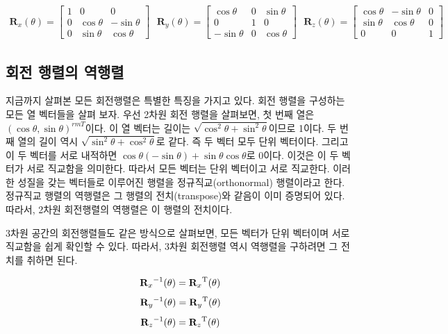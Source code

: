 {\small
\begin{eqnarray}
\mathbf R_x(\theta)
=
\left [ \begin{array}{rrr}
1 & 0 & 0 \\
0 & \cos \theta & - \sin \theta \\
0 & \sin \theta & \cos \theta
\end{array} \right ]
~~~
\mathbf R_y(\theta)
=
\left [ \begin{array}{rrr}
\cos \theta & 0 &  \sin \theta  \\
0 & 1 & 0 \\
- \sin \theta & 0 & \cos \theta
\end{array} \right ]
~~~
\mathbf R_z(\theta)
=
\left [ \begin{array}{rrr}
\cos \theta &- \sin \theta  & 0  \\
\sin \theta & \cos \theta  & 0 \\
0 & 0  & 1 
\end{array} \right ]
\end{eqnarray}
}

\subsection{회전 행렬의 역행렬}

지금까지 살펴본 모든 회전행렬은 특별한 특징을 가지고 있다.
회전 행렬을 구성하는 모든 열 벡터들을 살펴 보자.
우선 2차원 회전 행렬을 살펴보면, 첫 번째 열은 $(\cos \theta , \sin \theta)^{rm T}$이다.
이 열 벡터는 길이는 $\sqrt{ \cos^2 \theta + \sin^2 \theta}$이므로 1이다. 
두 번째 열의 길이 역시 $\sqrt{ \sin^2 \theta + \cos^2 \theta}$로 같다. 
즉 두 벡터 모두 단위 벡터이다. 그리고 이 두 벡터를 서로 내적하면
$\cos \theta ( - \sin \theta) + \sin \theta  \cos \theta $로 0이다. 이것은 이 두 벡터가 서로 직교함을 의미한다.
따라서 모든 벡터는 단위 벡터이고 서로 직교한다. 이러한 성질을 갖는 벡터들로 이루어진 행렬을 정규직교(orthonormal) 행렬이라고 한다.
정규직교 행렬의 역행렬은 그 행렬의 전치(transpose)와 같음이 이미 증명되어 있다.
따라서, 2차원 회전행렬의 역행렬은 이 행렬의 전치이다.

3차원 공간의 회전행렬들도 같은 방식으로 살펴보면, 모든 벡터가 단위 벡터이며 서로 직교함을 쉽게 확인할 수 있다.
따라서, 3차원 회전행렬 역시 역행렬을 구하려면 그 전치를 취하면 된다.

$${{\mathbf R}_x}^{-1}(\theta) = {{\mathbf R}_x}^{\rm T}(\theta)$$
$${{\mathbf R}_y}^{-1}(\theta) = {{\mathbf R}_y}^{\rm T}(\theta)$$
$${{\mathbf R}_z}^{-1}(\theta) = {{\mathbf R}_z}^{\rm T}(\theta)$$


